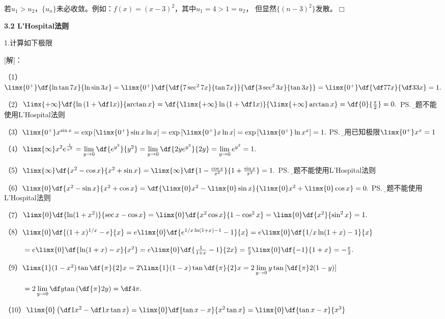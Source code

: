 若$u_1>u_2$，$\{u_n\}$未必收敛。例如：$f(x)=(x-3)^2$，其中$u_1=4>1=u_2$，
但显然$\{(n-3)^2\}$发散。\hfill$\Box$

\begin{center}
	\bf 3.2 L'Hospital法则
\end{center}

\bigskip

1.计算如下极限

[解]：

（1）$\limx{0^+}\df{\ln\tan 7x}{\ln\sin 3x}=\limx{0^+}\df{\df{7\sec^27x}{\tan7x}}{\df{3\sec^23x}{\tan3x}}
=\limx{0^+}\df{\df7{7x}}{\df3{3x}}=1.$

（2）$\limx{+\infty}\df{\ln\left(1+\df1x\right)}{\arctan x}
=\df{\limx{+\infty}\ln\left(1+\df1x\right)}{\limx{+\infty}\arctan
x}=\df{0}{\frac{\pi}2}=0.$
\ps{\b 本题不能使用L'Hospital法则}

（3）$\limx{0^+}x^{\sin x}=\exp\left[\limx{0^+}\sin x\ln x\right]
=\exp\left[\limx{0^+}x\ln x\right]=\exp\left[\limx{0^+}\ln x^x\right]
=1.$
\ps{\b 使用已知极限$\limx{0^+}x^x=1$}

（4）$\limx{\infty}x^2e^{\frac1{x^2}}
=\lim\limits_{y\to0}\df{e^{y^2}}{y^2}
=\lim\limits_{y\to0}\df{2ye^{y^2}}{2y}
=\lim\limits_{y\to0}e^{y^2}=1.$

（5）$\limx{\infty}\df{x^2-\cos x}{x^2+\sin x}
=\limx{\infty}\df{1-\frac{\cos x}{x^2}}{1+\frac{\sin x}{x^2}}=1.$
\ps{\b 本题不能使用L'Hospital法则}

（6）$\limx{0}\df{x^2-\sin x}{x^2+\cos x}
=\df{\limx{0}x^2-\limx{0}\sin x}{\limx{0}x^2+\limx{0}\cos x}=0.$
\ps{\b 本题不能使用L'Hospital法则}

（7）$\limx{0}\df{\ln(1+x^2)}{\sec x-\cos x}
=\limx{0}\df{x^2\cos x}{1-\cos^2 x}
=\limx{0}\df{x^2}{\sin^2 x}=1.$

（8）$\limx{0}\df{(1+x)^{1/x}-e}{x}
=e\limx{0}\df{e^{1/x\ln(1+x)-1}-1}{x}
=e\limx{0}\df{1/x\ln(1+x)-1}{x}$

$\hspace{1cm} =e\limx{0}\df{\ln(1+x)-x}{x^2}
=e\limx{0}\df{\frac1{1+x}-1}{2x}
=\frac e2\limx{0}\df{-1}{1+x}=-\frac e2.
$
 
（9）$\limx{1}(1-x^2)\tan\df{\pi}{2}x
=2\limx{1}(1-x)\tan\df{\pi}{2}x
=2\lim\limits_{y\to0}y\tan\left[\df{\pi}2(1-y)\right]$

$\hspace{1cm}
=2\lim\limits_{y\to0}\df y{\tan\left(\df{\pi}2y\right)}
=\df4{\pi}.$
 
（10）$\limx{0}\left(\df 1{x^2}-\df 1{x\tan x}\right)
=\limx{0}\df {\tan x-x}{x^2\tan x}
=\limx{0}\df {\tan x-x}{x^3}$

